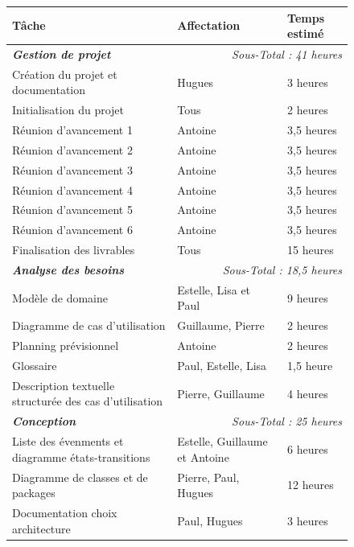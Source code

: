 \documentclass[paper=a4,fontsize=11pt]{report}
\numberwithin{equation}{section}		%
\numberwithin{figure}{section}		%
\numberwithin{table}{section}		%
\renewcommand{\bf}[1]{\textbf{#1}}
\renewcommand{\it}[1]{\textit{#1}}
\newcommand{\bfit}[1]{\textbf{\textit{#1}}}
\begin{document}
\begin{figure}[H]
\begin{center}
\begin{tabular}{  l  l  l  }
  \hline
  \bf{Tâche} & \bf{Affectation} & \bf{Temps estimé} \\
  \hline
  \hline
  \bfit{Gestion de projet} & \multicolumn{2}{r}{\it{Sous-Total : 41 heures}} \\
  \hline
  Création du projet et documentation & Hugues & 3 heures \\
  \hline
  Initialisation du projet & Tous & 2 heures \\
  \hline
  Réunion d'avancement 1 & Antoine & 3,5 heures \\
  \hline
  Réunion d'avancement 2 & Antoine & 3,5 heures \\
  \hline
  Réunion d'avancement 3 & Antoine & 3,5 heures \\
  \hline
  Réunion d'avancement 4 & Antoine & 3,5 heures \\
  \hline
  Réunion d'avancement 5 & Antoine & 3,5 heures \\
  \hline
  Réunion d'avancement 6 & Antoine & 3,5 heures \\
  \hline
  Finalisation des livrables & Tous & 15 heures \\
  \hline
  \hline
  \bfit{Analyse des besoins} & \multicolumn{2}{r}{\it{Sous-Total : 18,5 heures}} \\
  \hline
  Modèle de domaine & Estelle, Lisa et Paul & 9 heures \\
  \hline
  Diagramme de cas d'utilisation & Guillaume, Pierre & 2 heures \\
  \hline
  Planning prévisionnel & Antoine & 2 heures \\
  \hline
  Glossaire & Paul, Estelle, Lisa & 1,5 heure \\
  \hline
  Description textuelle structurée des cas d'utilisation & Pierre, Guillaume & 4 heures \\
  \hline
  \hline
  \bfit{Conception} & \multicolumn{2}{r}{\it{Sous-Total : 25 heures}} \\
  \hline
  Liste des évenments et diagramme états-transitions & Estelle, Guillaume et Antoine & 6 heures \\
  \hline
  Diagramme de classes et de packages & Pierre, Paul, Hugues & 12 heures \\
  \hline
  Documentation choix architecture & Paul, Hugues & 3 heures \\

\end{tabular}
\end{center}
\end{figure}
\end{document}
